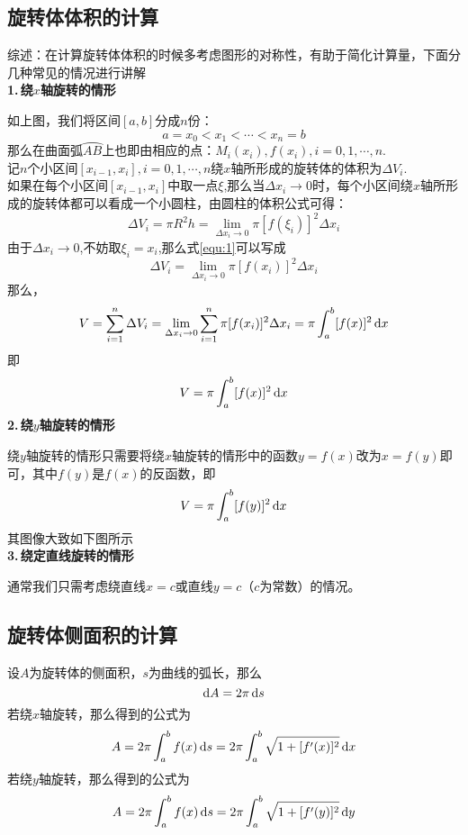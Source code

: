 \subsection{旋转体体积的计算}
\noindent 综述：在计算旋转体体积的时候多考虑图形的对称性，有助于简化计算量，下面分几种常见的情况进行讲解\\
\textbf{1.$\,$绕$x$轴旋转的情形}
\par 如上图，我们将区间$[a,b]$分成$n$份：
\begin{equation}
	\nonumber
	a=x_0<x_1<\cdots<x_n=b
\end{equation}
那么在曲面弧$\wideparen{AB}$上也即由相应的点：$M_i(x_i),f(x_i),i=0,1,\cdots,n$.\\
记$n$个小区间$[x_{i-1},x_i],i=0,1,\cdots,n$绕$x$轴所形成的旋转体的体积为$\Delta V_i$.\\
如果在每个小区间$[x_{i-1},x_i]$中取一点$\xi$,那么当$\Delta x_i\to0$时，每个小区间绕$x$轴所形成的旋转体都可以看成一个小圆柱，由圆柱的体积公式可得：
\begin{equation}
	\Delta V_i=\pi R^2 h=\lim\limits_{\Delta x_i\to0}\pi[f(\xi_i)]^2\Delta x_i
	\label{equ:1}
\end{equation}
由于$\Delta x_i\to0$,不妨取$\xi_i=x_i$,那么式\ref{equ:1}可以写成
\begin{equation}
	\Delta V_i=\lim\limits_{\Delta x_i\to0}\pi[f(x_i)]^2\Delta x_i
\end{equation}
那么，
\begin{equation}
	V=\sum_{i=1}^{n}\Delta V_i=\lim\limits_{\Delta x_i\to0}\sum_{i=1}^{n}\pi[f(x_i)]^2\Delta x_i=\pi\int_{a}^{b}[f(x)]^2\,{\rm{d}} x
\end{equation}
即
\begin{equation}
	V=\pi\int_{a}^{b}[f(x)]^2\,{\rm{d}} x
\end{equation}
\textbf{2.$\,$绕$y$轴旋转的情形}
\par 绕$y$轴旋转的情形只需要将绕$x$轴旋转的情形中的函数$y=f(x)$改为$x=f(y)$即可，其中$f(y)$是$f(x)$的反函数，即
\begin{equation}
	V=\pi\int_{a}^{b}[f(y)]^2\,{\rm{d}} x
\end{equation}
其图像大致如下图所示\\
\textbf{3.$\,$绕定直线旋转的情形}
\par 通常我们只需考虑绕直线$x=c$或直线$y=c$（$c$为常数）的情况。
\subsection{旋转体侧面积的计算}
\par 设$A$为旋转体的侧面积，$s$为曲线的弧长，那么
\begin{equation}
	{\rm{d}} A=2\pi\, {\rm{d}} s
\end{equation}
若绕$x$轴旋转，那么得到的公式为
\begin{equation}
	 A=2\pi \int_{a}^{b}f(x)\,{\rm{d}} s=2\pi\int_{a}^{b}\sqrt{1+[f'(x)]^2}\,{\rm{d}} x
\end{equation}
若绕$y$轴旋转，那么得到的公式为
\begin{equation}
	A=2\pi \int_{a}^{b}f(x)\,{\rm{d}} s=2\pi\int_{a}^{b}\sqrt{1+[f'(y)]^2}\,{\rm{d}} y
\end{equation}